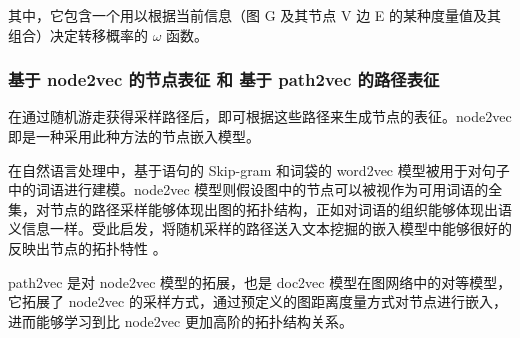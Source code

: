 其中，它包含一个用以根据当前信息（图 G 及其节点 V 边 E 的某种度量值及其组合）决定转移概率的 $\omega$ 函数。

\subsubsection{基于 node2vec 的节点表征 和 基于 path2vec 的路径表征}

在通过随机游走获得采样路径后，即可根据这些路径来生成节点的表征。node2vec 即是一种采用此种方法的节点嵌入模型。

在自然语言处理中，基于语句的 Skip-gram 和词袋的 word2vec 模型被用于对句子中的词语进行建模。node2vec 模型则假设图中的节点可以被视作为可用词语的全集，对节点的路径采样能够体现出图的拓扑结构，正如对词语的组织能够体现出语义信息一样。受此启发，将随机采样的路径送入文本挖掘的嵌入模型中能够很好的反映出节点的拓扑特性 。

path2vec  是对 node2vec 模型的拓展，也是 doc2vec 模型在图网络中的对等模型，它拓展了 node2vec 的采样方式，通过预定义的图距离度量方式对节点进行嵌入，进而能够学习到比 node2vec 更加高阶的拓扑结构关系。
